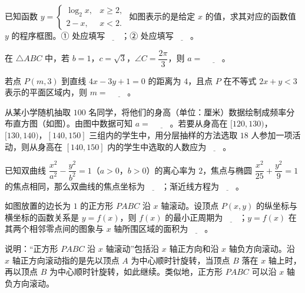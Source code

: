 \Needspace{0.4\textheight}
\begingroup
\renewenvironment{question}{\Needspace{0.5\textheight}}{}
\begin{question}
已知函数 $y=\begin{cases}\log_2x,&x\geqslant2,\\ 2-x,&x<2.\end{cases}$ 如图表示的是给定 $x$ 的值，求其对应的函数值 $y$ 的程序框图。① 处应填写$\underline{\qquad}$；② 处应填写$\underline{\qquad}$。
\nopagebreak[4]
\begin{center}\end{center}
\nopagebreak[4]
\end{question}
\endgroup
\begin{question}
在 $\triangle ABC$ 中，若 $b=1$，$c=\sqrt3$，$\angle C=\dfrac{2\pi}3$，则 $a=$ $\underline{\qquad}$。

\end{question}
\begin{question}
若点 $P(m,3)$ 到直线 $4x-3y+1=0$ 的距离为 $4$，且点 $P$ 在不等式 $2x+y<3$ 表示的平面区域内，则 $m=$ $\underline{\qquad}$。

\Needspace{0.4\textheight}
\end{question}
\begingroup
\renewenvironment{question}{\Needspace{0.5\textheight}}{}
\begin{question}
从某小学随机抽取 $100$ 名同学，将他们的身高（单位：厘米）数据绘制成频率分布直方图（如图）。由图中数据可知 $a=$ $\underline{\qquad}$。若要从身高在 $[120,130)$，$[130,140)$，$[140,150]$ 三组内的学生中，用分层抽样的方法选取 $18$ 人参加一项活动，则从身高在 $[140,150]$ 内的学生中选取的人数应为$\underline{\qquad}$。
\nopagebreak[4]
\begin{center}\end{center}
\nopagebreak[4]
\end{question}
\endgroup
\begin{question}
已知双曲线 $\dfrac{x^2}{a^2}-\dfrac{y^2}{b^2}=1$（$a>0$，$b>0$）的离心率为 $2$，焦点与椭圆 $\dfrac{x^2}{25}+\dfrac{y^2}9=1$ 的焦点相同，那么双曲线的焦点坐标为$\underline{\qquad}$；渐近线方程为$\underline{\qquad}$。

\Needspace{0.4\textheight}
\end{question}
\begingroup
\renewenvironment{question}{\Needspace{0.5\textheight}}{}
\begin{question}
如图放置的边长为 $1$ 的正方形 $PABC$ 沿 $x$ 轴滚动。设顶点 $P(x,y)$ 的纵坐标与横坐标的函数关系是 $y=f(x)$，则 $f(x)$ 的最小正周期为$\underline{\qquad}$；$y=f(x)$ 在其两个相邻零点间的图象与 $x$ 轴所围区域的面积为$\underline{\qquad}$。

说明：“正方形 $PABC$ 沿 $x$ 轴滚动”包括沿 $x$ 轴正方向和沿 $x$ 轴负方向滚动。沿 $x$ 轴正方向滚动指的是先以顶点 $A$ 为中心顺时针旋转，当顶点 $B$ 落在 $x$ 轴上时，再以顶点 $B$ 为中心顺时针旋转，如此继续。类似地，正方形 $PABC$ 可以沿 $x$ 轴负方向滚动。
\nopagebreak[4]
\begin{center}\end{center}
\nopagebreak[4]
\end{question}
\endgroup
{}

